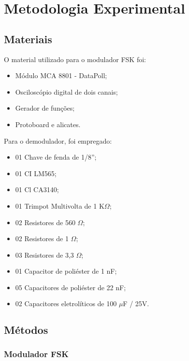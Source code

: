 \newpage
\section{Metodologia Experimental}

\subsection{Materiais}
O material utilizado para o modulador FSK foi:
\begin{itemize}
\item Módulo MCA 8801 - DataPoll;
\item Osciloscópio digital de dois canais;
\item Gerador de funções;
\item Protoboard e alicates.\\
\end{itemize}

Para o demodulador, foi empregado:
\begin{itemize}
    \item 01 Chave de fenda de 1/8”;
    \item 01 CI LM565;
    \item 01 Cl CA3140;
    \item 01 Trimpot Multivolta de 1 K$\Omega$;
    \item 02 Resistores de 560 $\Omega$;
    \item 02 Resistores de 1 $\Omega$;
    \item 03 Resistores de 3,3 $\Omega$;
    \item 01 Capacitor de poliéster de 1 nF;
    \item 05 Capacitores de poliéster de 22 nF;
    \item 02 Capacitores eletrolíticos de 100 $\mu$F / 25V.
\end{itemize}

\subsection{Métodos}

\subsubsection{Modulador FSK}

